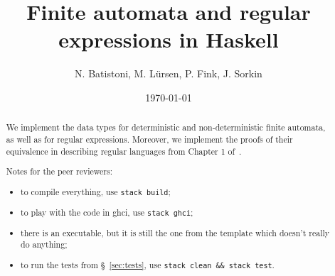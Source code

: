 \documentclass[12pt,a4paper]{article}
\title{Finite automata and regular expressions in Haskell}
\author{N. Batistoni, M. L\"ursen, P. Fink, J. Sorkin}
\date{\today}
\begin{document}
\maketitle

\begin{abstract}
    We implement the data types for deterministic and non-deterministic finite automata,
    as well as for regular expressions.
    Moreover, we implement the proofs of their equivalence in describing regular languages
    from Chapter 1 of~\cite{sipser2012}.

    Notes for the peer reviewers: \begin{itemize}
        \item to compile everything, use \verb|stack build|;
        \item to play with the code in ghci, use \verb|stack ghci|;
        \item there is an executable, but it is still the one from the template which doesn't really do anything;
        \item to run the tests from \S~\ref{sec:tests}, use \verb|stack clean && stack test|. 
    \end{itemize}
\end{abstract}

\vfill

\tableofcontents

\clearpage


% 













% 







\end{document}
